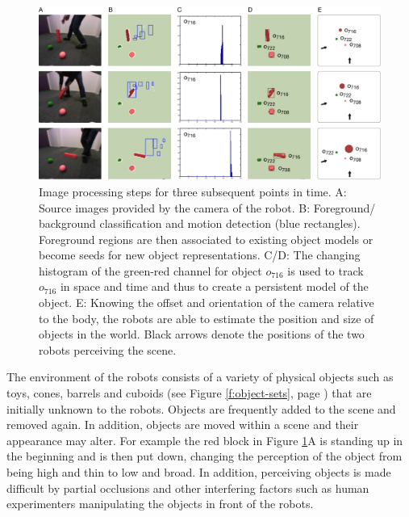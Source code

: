 \begin{figure}[t]
  \includegraphics[width=1\textwidth]{figures/vision-system-stages-overview}
  \caption{Image processing steps for three subsequent points in
    time. A: Source images provided by the camera of the robot. B:
    Foreground/ background classification and motion detection (blue
    rectangles). Foreground regions are then associated to existing
    object models or become seeds for new object representations. C/D:
    The changing histogram of the green-red channel for object
    $o_{716}$ is used to track $o_{716}$ in space and time and thus to
    create a persistent model of the object. E: Knowing the offset and
    orientation of the camera relative to the body, the robots are
    able to estimate the position and size of objects in the
    world. Black arrows denote the positions of the two robots
    perceiving the scene.}
\label{f:vision-system-overview}
\end{figure}

The environment of the robots consists of a variety of physical
objects such as toys, cones, barrels and cuboids (see Figure
\ref{f:object-sets}, page \pageref{f:object-sets}) that are initially
unknown to the robots. Objects are frequently added to the scene and
removed again. In addition, objects are moved within a scene and their
appearance may alter. For example the red block in Figure
\ref{f:vision-system-overview}A is standing up in the beginning and is
then put down, changing the perception of the object from being high
and thin to low and broad. In addition, perceiving objects is made
difficult by partial occlusions and other interfering factors such as
human experimenters manipulating the objects in front of the robots.

